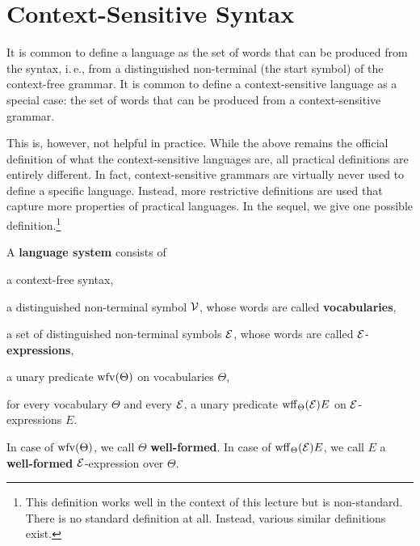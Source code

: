 

\section{Context-Sensitive Syntax}

It is common to define a language as the set of words that can be produced from the syntax, i.\,e., from a distinguished non-terminal (the start symbol) of the context-free grammar.
It is common to define a context-sensitive language as a special case: the set of words that can be produced from a context-sensitive grammar.

This is, however, not helpful in practice.
While the above remains the official definition of what the context-sensitive languages are, all practical definitions are entirely different.
In fact, context-sensitive grammars are virtually never used to define a specific language.
Instead, more restrictive definitions are used that capture more properties of practical languages.
In the sequel, we give one possible definition.\footnote{This definition works well in the context of this lecture but is non-standard. There is no standard definition at all. Instead, various similar definitions exist.}

\begin{definition}
A \textbf{language system} consists of
\begin{compactitem}
 \item a context-free syntax,
 \item a distinguished non-terminal symbol $\mathcal{V}$, whose words are called \textbf{vocabularies},
 \item a set of distinguished non-terminal symbols $\mathcal{E}$, whose words are called $\mathcal{E}$-\textbf{expressions},
 \item a unary predicate $\mathrm{wfv}(\Theta)$ on vocabularies $\Theta$,
 \item for every vocabulary $\Theta$ and every $\mathcal{E}$, a unary predicate $\mathrm{wff}_{\Theta}(\mathcal{E}){E}$ on $\mathcal{E}$-expressions $E$.
\end{compactitem}

In case of $\mathrm{wfv}(\Theta)$, we call $\Theta$ \textbf{well-formed}.
In case of $\mathrm{wff}_{\Theta}(\mathcal{E}){E}$, we call $E$ a \textbf{well-formed} $\mathcal{E}$-expression over $\Theta$.
\end{definition}

